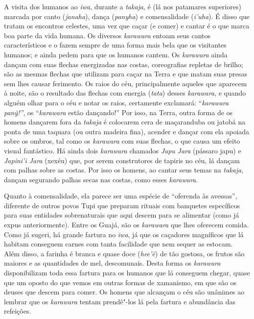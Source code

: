 A visita dos humanos ao \emph{iwa}, durante a \emph{takaja}, é (lá nos
patamares superiores) marcada por canto (\emph{janaha}), dança
(\emph{panyha}) e comensalidade (\emph{i'uha}). É disso que tratam os
encontros celestes, uma vez que caçar (e comer) e cantar é o que marca
boa parte da vida humana. Os diversos \emph{karawara} entoam seus cantos
característicos e o fazem sempre de uma forma mais bela que os
visitantes humanos; e ainda pedem para que os humanos cantem. Os
\emph{karawara} ainda dançam com suas flechas energizadas nas costas,
coreografias repletas de brilho; são as mesmas flechas que utilizam para
caçar na Terra e que matam suas presas sem lhes causar ferimento. Os
raios do céu, principalmente aqueles que aparecem à noite, são o
resultado das flechas com energia (\emph{tata}) desses \emph{karawara},
e quando alguém olhar para o céu e notar os raios, certamente exclamará:
``\emph{karawara} \emph{panỹ!''}, os ``\emph{karawara} estão dançando!'' Por
isso, na Terra, outra forma de os homens dançarem fora da \emph{takaja}
é colocarem cera de maçaranduba ou jatobá na ponta de uma taquara (ou
outra madeira fina), acender e dançar com ela apoiada sobre os ombros,
tal como os \emph{karawara} com suas flechas, o que causa um efeito
visual fantástico. Há ainda dois \emph{karawara} chamados \emph{Japu}
\emph{Jara} (pássaro japu) e \emph{Japini'i Jara} (xexéu) que, por serem
construtores de tapiris no céu, lá dançam com palhas sobre as costas.
Por isso os homens, ao cantar seus temas na \emph{takaja}, dançam
segurando palhas secas nas costas, como esses \emph{karawara}.

Quanto à comensalidade, ela parece ser uma espécie de ``oferenda às
avessas'', diferente de outros povos Tupi que preparam rituais com
banquetes específicos para suas entidades sobrenaturais que aqui descem
para se alimentar (como já expus anteriormente). Entre os Guajá, são os
\emph{karawara} que lhes oferecem comida. Como já sugeri, há grande
fartura no \emph{iwa}, já que os caçadores magníficos que lá habitam
conseguem carnes com tanta facilidade que nem sequer as estocam. Além
disso, a farinha é branca e quase doce (\emph{hee'ẽ}) de tão gostosa, os
frutos são maiores e as quantidades de mel, descomunais. Desta forma os
\emph{karawara} disponibilizam toda essa fartura para os humanos que lá
conseguem chegar, quase que um oposto do que vemos em outras formas de
xamanismo, em que são os deuses que descem para comer. Os homens que
alcançam o céu são unânimes ao lembrar que os \emph{karawara} tentam
prendê"-los lá pela fartura e abundância das refeições.

